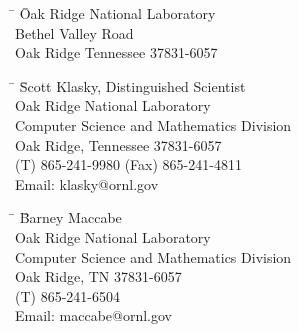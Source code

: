 \thispagestyle{empty}

\begin{center}
\textbf{\Large \baseproposaltitle}
\end{center}

\begin{center}
\end{center}

\medskip

\begin{tabbing}
\hspace*{10mm} \=  \= Oak Ridge National Laboratory \\
\>   Bethel Valley Road\\
\> \> Oak Ridge Tennessee 37831-6057\\
\end{tabbing}

\medskip

\begin{tabbing}
\hspace*{10mm} \=  \= Scott Klasky,  Distinguished Scientist \\
\> \> Oak Ridge National Laboratory \\
\> \> Computer Science and Mathematics Division \\
\> \> Oak Ridge, Tennessee 37831-6057 \\
\> \> (T) 865-241-9980 (Fax) 865-241-4811 \\
\> \> Email: klasky@ornl.gov
\end{tabbing}

\medskip

\begin{tabbing}
\hspace*{10mm} \=  \= Barney Maccabe \\
\> \> Oak Ridge National Laboratory \\
\> \> Computer Science and Mathematics Division \\
\> \> Oak Ridge, TN 37831-6057 \\
\> \> (T) 865-241-6504 \\
\> \> Email: maccabe@ornl.gov
\end{tabbing}

